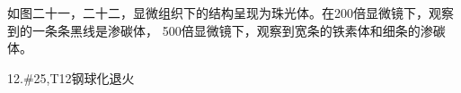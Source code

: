 \documentclass[a4paper,utf8]{article}
\begin{document}
如图二十一，二十二，显微组织下的结构呈现为珠光体。在200倍显微镜下，观察到的一条条黑线是渗碳体，
500倍显微镜下，观察到宽条的铁素体和细条的渗碳体。
\begin{figure}[!ht]
    \begin{floatrow}
            
    \end{floatrow}

\end{figure}

12.\#25,T12钢球化退火
\end{document}
